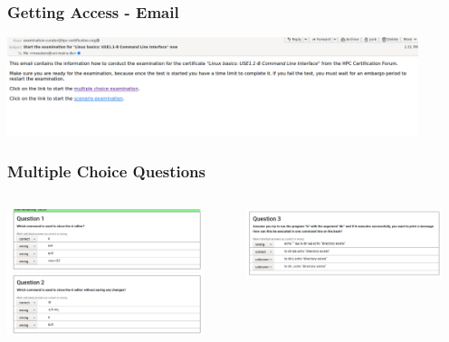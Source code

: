\begin{frame}
  \frametitle{Getting Access - Email}
  \includegraphics[width=0.9\textwidth]{images/email}
\end{frame}


\begin{frame}
  \frametitle{Multiple Choice Questions}
  \begin{columns}
   \begin{column}{.5\textwidth}
      \includegraphics[width=0.9\textwidth]{images/questions_2}
   \end{column}
   \begin{column}{.5\textwidth}
       \centering
      \includegraphics[width=0.9\textwidth]{images/question_1}
    \end{column}
  \end{columns}
\end{frame}

